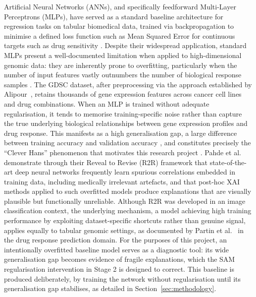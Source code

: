 \label{ssub:ann}

Artificial Neural Networks (ANNs), and specifically feedforward Multi-Layer Perceptrons (MLPs),
have served as a standard baseline architecture for regression tasks on tabular biomedical data,
trained via backpropagation to minimise a defined loss function such as Mean Squared Error for
continuous targets such as drug sensitivity \cite{Goodfellow2016,Arrieta2020}.
Despite their widespread application, standard MLPs present a well-documented limitation when
applied to high-dimensional genomic data: they are inherently prone to overfitting, particularly
when the number of input features vastly outnumbers the number of biological response samples
\cite{Partin2023}. The GDSC dataset, after preprocessing via the approach established by
Alipour~\cite{Alipour2024}, retains thousands of gene expression features across cancer cell lines
and drug combinations. When an MLP is trained without adequate regularisation, it tends to memorise
training-specific noise rather than capture the true underlying biological relationships between gene
expression profiles and drug response. This manifests as a high generalisation gap, a large
difference between training accuracy and validation accuracy \cite{Ye2024}, and constitutes precisely
the ``Clever Hans'' phenomenon that motivates this research project \cite{Samek2017,Anders2022}.
Pahde et al.~\cite{Pahde2023} demonstrate through their Reveal to Revise (R2R) framework that
state-of-the-art deep neural networks frequently learn spurious correlations embedded in training
data, including medically irrelevant artefacts, and that post-hoc XAI methods applied to such
overfitted models produce explanations that are visually plausible but functionally unreliable.
Although R2R was developed in an image classification context, the underlying mechanism, a model
achieving high training performance by exploiting dataset-specific shortcuts rather than genuine
signal, applies equally to tabular genomic settings, as documented by Partin et
al.~\cite{Partin2023} in the drug response prediction domain. For the purposes of this project, an
intentionally overfitted baseline model serves as a diagnostic tool: its wide generalisation gap
becomes evidence of fragile explanations, which the SAM regularisation intervention in Stage 2 is
designed to correct. This baseline is produced deliberately, by training the network without
regularisation until its generalisation gap stabilises, as detailed in
Section~\ref{sec:methodology}.

